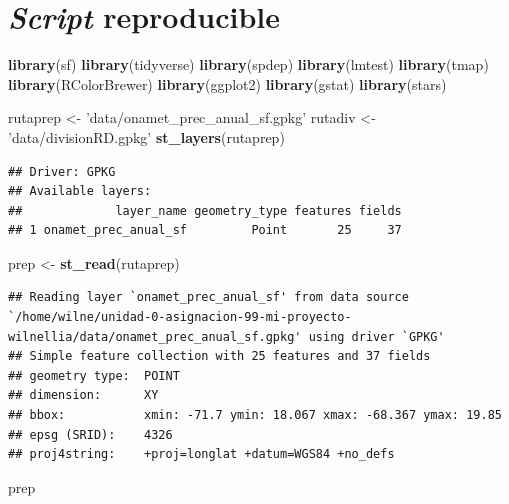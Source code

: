 \documentclass[11pt,]{article}
\newenvironment{Shaded}{\begin{snugshade}}{\end{snugshade}}
\newcommand{\KeywordTok}[1]{\textcolor[rgb]{0.13,0.29,0.53}{\textbf{#1}}}
\newcommand{\StringTok}[1]{\textcolor[rgb]{0.31,0.60,0.02}{#1}}
\newcommand{\NormalTok}[1]{#1}
\begin{document}
\section{\texorpdfstring{\emph{Script}
reproducible}{Script reproducible}}\label{script-reproducible}

\begin{Shaded}
\begin{Highlighting}[]
\KeywordTok{library}\NormalTok{(sf)}
\KeywordTok{library}\NormalTok{(tidyverse)}
\KeywordTok{library}\NormalTok{(spdep)}
\KeywordTok{library}\NormalTok{(lmtest)}
\KeywordTok{library}\NormalTok{(tmap)}
\KeywordTok{library}\NormalTok{(RColorBrewer)}
\KeywordTok{library}\NormalTok{(ggplot2)}
\KeywordTok{library}\NormalTok{(gstat)}
\KeywordTok{library}\NormalTok{(stars)}

\NormalTok{rutaprep <-}\StringTok{ 'data/onamet_prec_anual_sf.gpkg'}
\NormalTok{rutadiv <-}\StringTok{ 'data/divisionRD.gpkg'}
\KeywordTok{st_layers}\NormalTok{(rutaprep)}
\end{Highlighting}
\end{Shaded}

\begin{verbatim}
## Driver: GPKG 
## Available layers:
##             layer_name geometry_type features fields
## 1 onamet_prec_anual_sf         Point       25     37
\end{verbatim}

\begin{Shaded}
\begin{Highlighting}[]
\NormalTok{prep <-}\StringTok{ }\KeywordTok{st_read}\NormalTok{(rutaprep)}
\end{Highlighting}
\end{Shaded}

\begin{verbatim}
## Reading layer `onamet_prec_anual_sf' from data source `/home/wilne/unidad-0-asignacion-99-mi-proyecto-wilnellia/data/onamet_prec_anual_sf.gpkg' using driver `GPKG'
## Simple feature collection with 25 features and 37 fields
## geometry type:  POINT
## dimension:      XY
## bbox:           xmin: -71.7 ymin: 18.067 xmax: -68.367 ymax: 19.85
## epsg (SRID):    4326
## proj4string:    +proj=longlat +datum=WGS84 +no_defs
\end{verbatim}

\begin{Shaded}
\begin{Highlighting}[]
\NormalTok{prep}
\end{Highlighting}
\end{Shaded}
\end{document}
